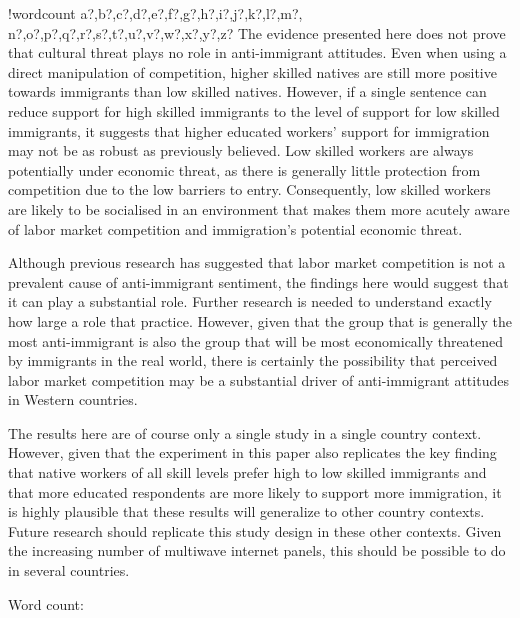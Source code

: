 \documentclass{article}\usepackage[]{graphicx}\usepackage[]{color}
\newcounter{words}
\newenvironment{counted}{%
\setcounter{words}{0}
\SearchList!{wordcount}{\stepcounter{words}}
{a?,b?,c?,d?,e?,f?,g?,h?,i?,j?,k?,l?,m?,
n?,o?,p?,q?,r?,s?,t?,u?,v?,w?,x?,y?,z?}
\UndoBoundary{'}
\SearchOrder{p;}}{%
\StopSearching}
\begin{document}
\begin{counted}
The evidence presented here does not prove that cultural threat plays no role in anti-immigrant attitudes. Even when using a direct manipulation of competition, higher skilled natives are still more positive towards immigrants than low skilled natives. However, if a single sentence can reduce support for high skilled immigrants to the level of support for low skilled immigrants, it suggests that higher educated workers' support for immigration may not be as robust as previously believed. Low skilled workers are always potentially under economic threat, as there is generally little protection from competition due to the low barriers to entry. Consequently, low skilled workers are likely to be socialised in an environment that makes them more acutely aware of labor market competition and immigration's potential economic threat. 

Although previous research has suggested that labor market competition is not a prevalent cause of anti-immigrant sentiment, the findings here would suggest that it can play a substantial role. Further research is needed to understand exactly how large a role that practice. However, given that the group that is generally the most anti-immigrant is also the group that will be most economically threatened by immigrants in the real world, there is certainly the possibility that perceived labor market competition may be a substantial driver of anti-immigrant attitudes in Western countries.

The results here are of course only a single study in a single country context. However, given that the experiment in this paper also replicates the key finding that native workers of all skill levels prefer high to low skilled immigrants and that more educated respondents are more likely to support more immigration, it is highly plausible that these results will generalize to other country contexts. Future research should replicate this study design in these other contexts. Given the increasing number of multiwave internet panels, this should be possible to do in several countries. 

\end{counted}
\begin{center}
Word count: \thewords\ 
\end{center}

\newpage

\printbibliography

\newpage
\end{document}
